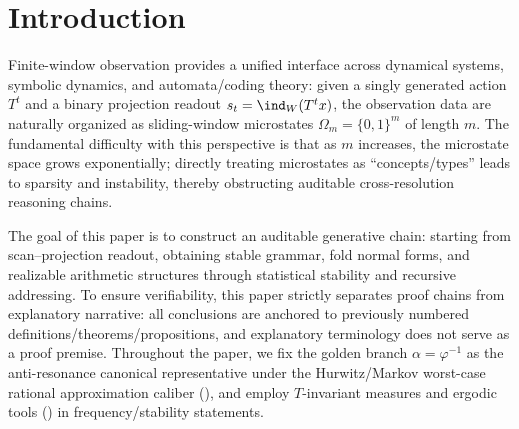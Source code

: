 \section{Introduction}\label{sec:introduction}

Finite-window observation provides a unified interface across dynamical systems, symbolic dynamics, and automata/coding theory: given a singly generated action \(T^t\) and a binary projection readout \(s_t=\ind_W(T^t x)\), the observation data are naturally organized as sliding-window microstates \(\Omega_m=\{0,1\}^m\) of length \(m\). The fundamental difficulty with this perspective is that as \(m\) increases, the microstate space grows exponentially; directly treating microstates as ``concepts/types'' leads to sparsity and instability, thereby obstructing auditable cross-resolution reasoning chains.
\par
The goal of this paper is to construct an auditable generative chain: starting from scan--projection readout, obtaining stable grammar, fold normal forms, and realizable arithmetic structures through statistical stability and recursive addressing. To ensure verifiability, this paper strictly separates proof chains from explanatory narrative: all conclusions are anchored to previously numbered definitions/theorems/propositions, and explanatory terminology does not serve as a proof premise. Throughout the paper, we fix the golden branch \(\alpha=\varphi^{-1}\) as the anti-resonance canonical representative under the Hurwitz/Markov worst-case rational approximation caliber (\cite{Cassels1957,KuipersNiederreiter1974}), and employ \(T\)-invariant measures and ergodic tools (\cite{WaltersErgodicTheory}) in frequency/stability statements.

